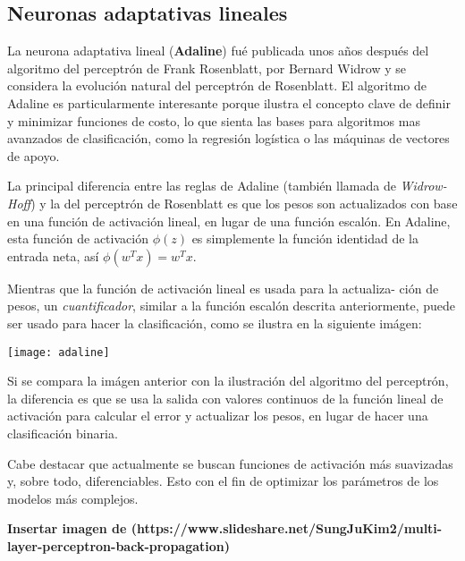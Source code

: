 \subsection{Neuronas adaptativas lineales}
La neurona adaptativa lineal (\textbf{Adaline}) fué publicada unos años
después del algoritmo del perceptrón de Frank Rosenblatt, por Bernard
Widrow \cite{adaline} y se considera la evolución natural del perceptrón
de Rosenblatt.
El algoritmo de Adaline es particularmente interesante porque ilustra
el concepto clave de definir y minimizar funciones de costo, lo que
sienta las bases para algoritmos mas avanzados de clasificación,
como la regresión logística o las máquinas de vectores de apoyo.

La principal diferencia entre las reglas de Adaline (también llamada
de \textit{Widrow-Hoff}) y la del perceptrón de Rosenblatt es que los
pesos son actualizados con base en una función de activación lineal,
en lugar de una función escalón. En Adaline, esta función de activación
$\phi (z)$ es simplemente la función identidad de la entrada neta, así
$\phi (w^T x) = w^T x$.

Mientras que la función de activación lineal es usada para la actualiza-
ción de pesos, un \textit{cuantificador}, similar a la función escalón
descrita anteriormente, puede ser usado para hacer la clasificación,
como se ilustra en la siguiente imágen:

\texttt{[image: adaline]}\cite{python}

Si se compara la imágen anterior con la ilustración del algoritmo del
perceptrón, la diferencia es que se usa la salida con valores continuos
de la función lineal de activación para calcular el error y actualizar
los pesos, en lugar de hacer una clasificación binaria.

Cabe destacar que actualmente se buscan funciones de activación más
suavizadas y, sobre todo, diferenciables. Esto con el fin de optimizar
los parámetros de los modelos más complejos.

\textbf{Insertar imagen de (https://www.slideshare.net/SungJuKim2/multi-layer-perceptron-back-propagation)}
